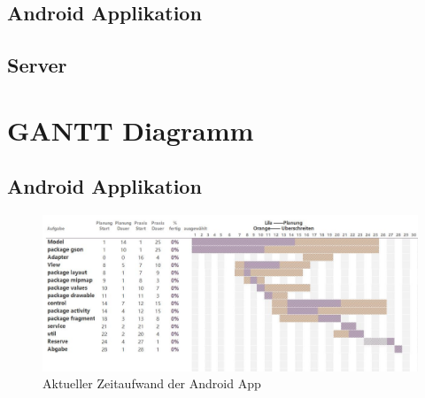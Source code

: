 \documentclass[a4paper]{scrreprt}
\begin{document}
        \section{Android Applikation}





        \section{Server}


           \newpage
    \chapter{GANTT Diagramm}

        \section{Android Applikation}
        \begin{figure}[H]
                \centering
                \includegraphics[scale = 0.65]{aktuelleAndroidAppZeitplanung.jpg}
                \caption{Aktueller Zeitaufwand der Android App }
        \end{figure}
\end{document}
